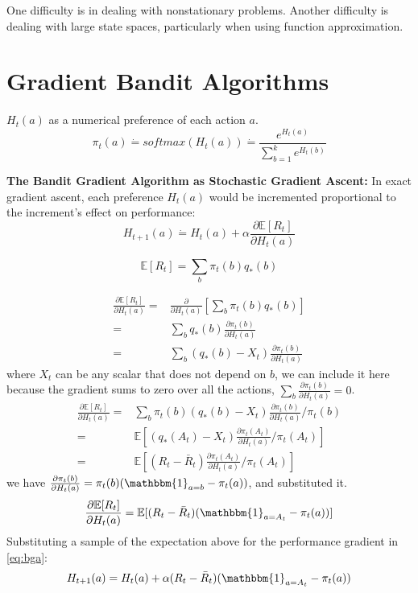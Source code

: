 One difficulty is in dealing with nonstationary problems. Another difficulty is dealing with large state spaces, particularly when using function approximation.

\section{Gradient Bandit Algorithms}
$H_t(a)$ as a numerical preference of each action $a$. 
\begin{equation}
    \pi_t(a) \dot{=} softmax(H_t(a))\dot{=}\frac{e^{H_t(a)}}{\sum_{b=1}^{k}e^{H_t(b)}}
\end{equation}

\textbf{The Bandit Gradient Algorithm as Stochastic Gradient Ascent:} In exact gradient ascent, each preference $H_t(a)$ would be incremented proportional to the increment’s effect on performance:
\begin{equation}
\label{eq:bga}
    H_{t+1}(a) \dot{=} H_t(a) + \alpha \frac{\partial\mathbb{E}[R_t]}{\partial H_t(a)}
\end{equation}

\begin{equation}
    \mathbb{E}[R_t] = \sum_{b}\pi_t(b)q_{*}(b)
\end{equation}

\begin{equation}
\begin{split}
    \frac{\partial \mathbb{E}[R_t]}{\partial H_t(a)} = & \frac{\partial}{\partial H_t(a)}[\sum_{b}\pi_t(b)q_*(b)]\\
    = & \sum_{b}q_*(b) \frac{\partial \pi_t(b)}{\partial H_t(a)}\\
    = & \sum_{b}(q_*(b)-X_t)\frac{\partial \pi_t(b)}{\partial H_t(a)}
\end{split}
\end{equation}
where $X_t$ can be any scalar that does not depend on $b$, we can include it here because the gradient sums to zero over all the actions, $\sum_b\frac{\partial \pi_t(b)}{\partial H_t(a)}=0$.
\begin{equation}
\begin{split}
    \frac{\partial \mathbb{E}[R_t]}{\partial H_t(a)} = & \sum_b \pi_t(b) (q_*(b)-X_t)\frac{\partial \pi_t(b)}{\partial H_t(a)}/\pi_t(b)\\
    = & \mathbb{E}[(q_*(A_t)-X_t)\frac{\partial \pi_t(A_t)}{\partial H_t(a)}/\pi_t(A_t)] \\
    = & \mathbb{E}[(R_t-\bar{R}_t)\frac{\partial \pi_t(A_t)}{\partial H_t(a)}/\pi_t(A_t)]
\end{split}
\end{equation}
we have $\frac{\partial \pi_t(b)}{\partial H_t(a)}=\pi_t(b)(\mathbbm{1}_{a=b}-\pi_t(a))$, and substituted it.
\begin{equation}
    \frac{\partial \mathbb{E}[R_t]}{\partial H_t(a)}=\mathbb{E}[(R_t-\bar{R}_t)(\mathbbm{1}_{a=A_t}-\pi_t(a))]
\end{equation}
Substituting a sample of the expectation above for the performance gradient in \ref{eq:bga}:
\begin{equation}
    H_{t+1}(a) = H_t(a) + \alpha (R_t-\bar{R}_t)(\mathbbm{1}_{a=A_t}-\pi_t(a))
\end{equation}